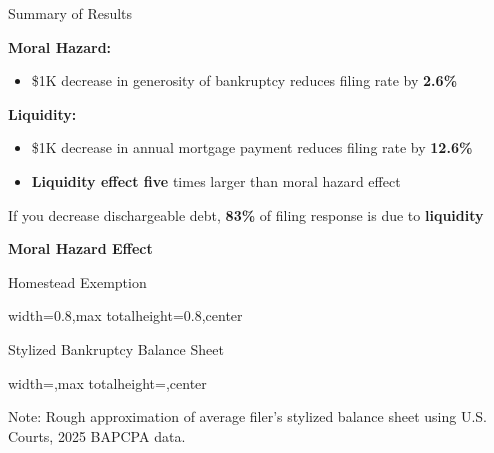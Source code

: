 \documentclass[aspectratio=169]{beamer}
\renewenvironment{alertblock}[1]{%
    \par\medskip\noindent
    {\usebeamercolor[fg]{frametitle}#1}\enspace
    \ignorespaces
}{%
    \par\medskip
}
\begin{document}
\begin{frame}{Summary of Results}

\textbf{Moral Hazard:}
\begin{itemize}
    \item \$1K decrease in generosity of bankruptcy reduces filing rate by \textbf{2.6\%}
\end{itemize}
\textbf{Liquidity:}
\begin{itemize}
        \item \$1K decrease in annual mortgage payment reduces filing rate by \textbf{12.6\%}
    \end{itemize}

\vspace{0.3cm}

\begin{itemize}
    \item[{\usebeamercolor[fg]{itemize item}$\Rightarrow$}] \textbf{Liquidity effect five} times larger than moral hazard effect
\end{itemize}

\vspace{0.3cm}

If you decrease dischargeable debt, \textbf{83\%} of filing response is due to \textbf{liquidity}


\end{frame}

\begin{frame}[plain]
    \centering
    {\Huge\bfseries Moral Hazard Effect}
\end{frame}

\begin{frame}{Homestead Exemption}
    \centering
    \begin{adjustbox}{width=0.8\textwidth,max totalheight=0.8\textheight,center}
        
    \end{adjustbox}
\end{frame}

\begin{frame}{Stylized Bankruptcy Balance Sheet}
    \vspace{0.2cm}
    \centering
    \begin{adjustbox}{width=\textwidth,max totalheight=\textheight,center}
        
    \end{adjustbox}
    \par\smallskip
    {\tiny\raggedright Note: Rough approximation of average filer's stylized balance sheet using U.S. Courts, 2025 BAPCPA  data.\par}
\end{frame}
\end{document}
